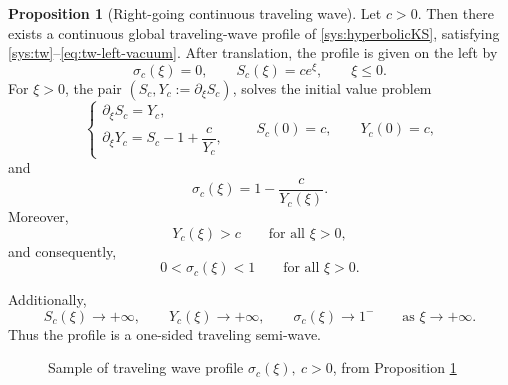 \documentclass[12pt]{article}
\theoremstyle{definition}
\newtheorem{proposition}[theorem]{Proposition}
\theoremstyle{remark}
\numberwithin{equation}{section}
\begin{document}
\begin{proposition}[Right-going continuous traveling wave]
\label{prop:tw-cnt}
Let \(c>0\). Then there exists a continuous global traveling-wave profile of \eqref{sys:hyperbolicKS}, satisfying \eqref{sys:tw}--\eqref{eq:tw-left-vacuum}.
After translation, the profile is given on the left by
\[
\sigma_c(\xi)=0,
\qquad
S_c(\xi)=ce^\xi,
\qquad
\xi\le0.
\]
For \(\xi>0\), the pair \((S_c,Y_c := \partial_\xi S_c)\),
solves the initial value problem
\begin{equation}
\begin{cases}
\partial_\xi S_c=Y_c,\\[4pt]
\partial_\xi Y_c=S_c-1+\dfrac{c}{Y_c},
\end{cases}
\qquad
S_c(0)=c,
\qquad
Y_c(0)=c,
\label{eq:tw-system}
\end{equation}
and
\begin{equation}
\sigma_c(\xi)=1-\frac{c}{Y_c(\xi)}.
\label{eq:tw-sigma}
\end{equation}
Moreover,
\[
Y_c(\xi)>c
\qquad
\text{for all }\xi>0,
\]
and consequently,
\[
0<\sigma_c(\xi)<1
\qquad
\text{for all }\xi>0.
\]

Additionally,
\[
S_c(\xi)\to+\infty,
\qquad
Y_c(\xi)\to+\infty,
\qquad
\sigma_c(\xi)\to1^-
\qquad
\text{as }\xi\to+\infty.
\]
Thus the profile is a one-sided traveling semi-wave.
\end{proposition}

\begin{figure}[htbp]
\centering
{}
\caption{Sample of traveling wave profile $\sigma_c(\xi), \ c > 0 $, from Proposition \ref{prop:tw-cnt}}
\label{fig:sigma_c_traveling_rg-cnt}
\end{figure}
\end{document}
